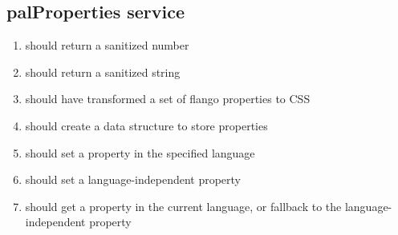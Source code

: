 \begin{singlespace}
\section{palProperties service}
\begin{enumerate}
\item         should return a sanitized number
\item         should return a sanitized string
\item         should have transformed a set of flango properties to CSS
\item         should create a data structure to store properties
\item         should set a property in the specified language
\item         should set a language-independent property
\item         should get a property in the current language, or fallback to the language-independent property
\end{enumerate}


\end{singlespace}
